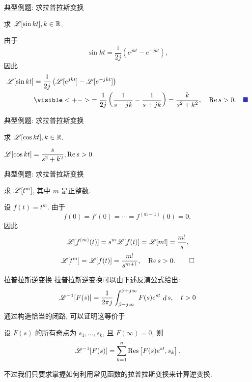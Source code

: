 \begin{frame}{典型例题: 求拉普拉斯变换}
\begin{example}
求 $\mathscr{L}[\sin{kt}],k\in{\mathbb{R}}$.
\end{example}
\begin{solutions}
由于
\[\sin{kt}=\frac1{2j}(e^{jkt}-e^{-jkt}),\]
\onslide<+->
因此
\begin{align*}
\msl[\sin{kt}]&=\frac1{2j}\left(\msl[e^{jkt}]-\msl[e^{-jkt}]\right)\\
&\visible<+->{=\frac1{2j}\left(\frac1{s-jk}-\frac1{s+jk}\right)=\frac k{s^2+k^2},\quad \Re s>0.\mqed}
\end{align*}
\end{solutions}
\end{frame}


\begin{frame}{典型例题: 求拉普拉斯变换}
\begin{exercise}
求 $\mathscr{L}[\cos{kt}],k\in{\mathbb{R}}$.
\end{exercise}
\begin{answer}
$\mathscr{L}[\cos{kt}]=\dfrac s{s^2+k^2},\operatorname{Re} s>0$.
\end{answer}
\end{frame}


\begin{frame}{典型例题: 求拉普拉斯变换}
\begin{example}
求 $\mathscr{L}[t^m]$, 其中 $m$ 是正整数.
\end{example}
\begin{solution}
设 $f(t)=t^m$. 由于
\[f(0)=f'(0)=\cdots=f^{(m-1)}(0)=0,\]
\onslide<+->
因此
\[\mathscr{L}[f^{(m)}(t)]=s^m\mathscr{L}[f(t)]=\mathscr{L}[m!]=\frac{m!}s,\]
\onslide<+->
\[\mathscr{L}[t^m]=\mathscr{L}[f(t)]=\frac{m!}{s^{m+1}},\quad \operatorname{Re} s>0.\qedhere\]
\end{solution}
\end{frame}


\begin{frame}{拉普拉斯逆变换}
\onslide<+->
拉普拉斯逆变换可以由下述反演公式给出:
\[\mathscr{L}^{-1}[F(s)]=\frac1{2\pi j}\int_{\beta-j\infty}^{\beta+j\infty}F(s)e^{st}\,\mathop{d} s,\quad t>0\]
\onslide<+->
通过构造恰当的闭路, 可以证明这等价于
\begin{theorem}[拉普拉斯逆变换定理]
设 $F(s)$ 的所有奇点为 $s_1,\dots,s_k$, 且 $F(\infty)=0$, 则
\[\mathscr{L}^{-1}[F(s)]=\sum_{k=1}^n {\mathrm{Res}}\left[F(s)e^{st},s_k\right].\]
\end{theorem}
\onslide<+->
不过我们只要求掌握如何利用常见函数的拉普拉斯变换来计算逆变换.
\end{frame}


